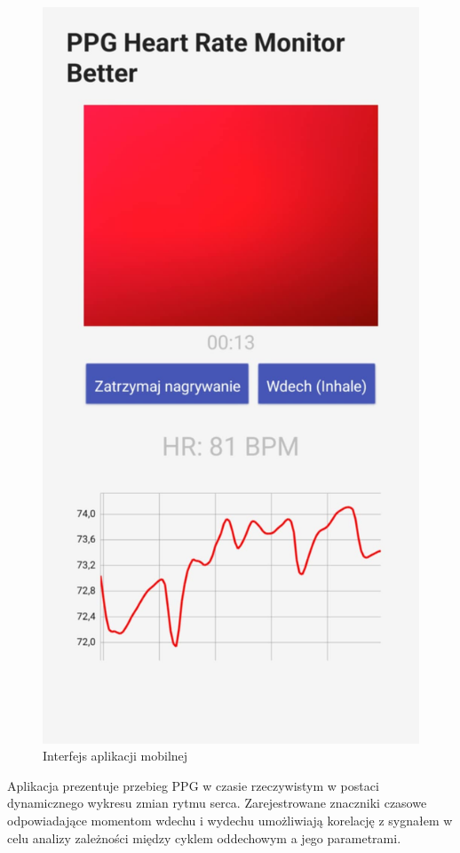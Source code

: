 \documentclass[journal]{IEEEtran}
\begin{document}
{\begin{figure}[htbp]
    \centering
    \includegraphics[scale=0.17]{aplikacja.png}
    \caption{Interfejs aplikacji mobilnej}
    \label{fig:aplikacja_mobilna}
\end{figure}


Aplikacja prezentuje przebieg PPG w czasie rzeczywistym w postaci dynamicznego wykresu zmian rytmu serca. Zarejestrowane znaczniki czasowe odpowiadające momentom wdechu i wydechu umożliwiają korelację z sygnałem w celu analizy zależności między cyklem oddechowym a jego parametrami.


}
\end{document}
